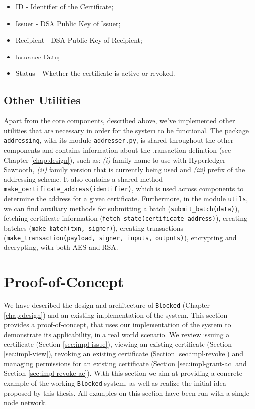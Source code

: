 \begin{itemize}
	\item ID - Identifier of the Certificate;
	\item Issuer - DSA Public Key of Issuer;
	\item Recipient - DSA Public Key of Recipient;
	\item Issuance Date;
	\item Status - Whether the certificate is active or revoked.
\end{itemize}

\subsection{Other Utilities}

Apart from the core components, described above, we've implemented other utilities that are necessary in order for the system to be functional. The package \texttt{addressing}, with its module \texttt{addresser.py}, is shared throughout the other components and contains  information about the transaction definition (see Chapter \ref{chap:design}), such as: \emph{(i)} family name to use with Hyperledger Sawtooth, \emph{(ii)} family version that is currently being used and \emph{(iii)} prefix of the addressing scheme. It also contains a shared method \texttt{make\_certificate\_address(identifier)}, which is used across components to determine the address for a given certificate. Furthermore, in the module \texttt{utils}, we can find auxiliary methods for submitting a batch (\texttt{submit\_batch(data)}), fetching certificate information (\texttt{fetch\_state(certificate\_address)}), creating batches (\texttt{make\_batch(txn, signer)}), creating transactions (\texttt{make\_transaction(payload, signer, inputs, outputs)}), encrypting and decrypting, with both AES and RSA.

\section{Proof-of-Concept}
\label{sec:implementation-poc}

We have described the design and architecture of \texttt{Blocked} (Chapter \ref{chap:design}) and an existing implementation of the system. This section provides a proof-of-concept, that uses our implementation of the system to demonstrate its applicability, in a real world scenario. We review issuing a certificate (Section \ref{sec:impl-issue}), viewing an existing certificate (Section \ref{sec:impl-view}), revoking an existing certificate (Section \ref{sec:impl-revoke}) and managing permissions for an existing certificate (Section \ref{sec:impl-grant-ac} and Section \ref{sec:impl-revoke-ac}). With this section we aim at providing a concrete example of the working \texttt{Blocked} system, as well as realize the initial idea proposed by this thesis. All examples on this section have been run with a single-node network.

